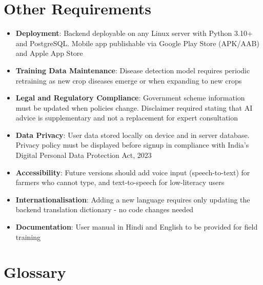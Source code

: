 \documentclass[12pt,a4paper]{article}
\begin{document}
\section{Other Requirements}

\begin{itemize}
    \item \textbf{Deployment}: Backend deployable on any Linux server with Python 3.10+ and PostgreSQL. Mobile app publishable via Google Play Store (APK/AAB) and Apple App Store
    \item \textbf{Training Data Maintenance}: Disease detection model requires periodic retraining as new crop diseases emerge or when expanding to new crops
    \item \textbf{Legal and Regulatory Compliance}: Government scheme information must be updated when policies change. Disclaimer required stating that AI advice is supplementary and not a replacement for expert consultation
    \item \textbf{Data Privacy}: User data stored locally on device and in server database. Privacy policy must be displayed before signup in compliance with India's Digital Personal Data Protection Act, 2023
    \item \textbf{Accessibility}: Future versions should add voice input (speech-to-text) for farmers who cannot type, and text-to-speech for low-literacy users
    \item \textbf{Internationalisation}: Adding a new language requires only updating the backend translation dictionary - no code changes needed
    \item \textbf{Documentation}: User manual in Hindi and English to be provided for field training
\end{itemize}

\appendix
\section{Glossary}
\end{document}
